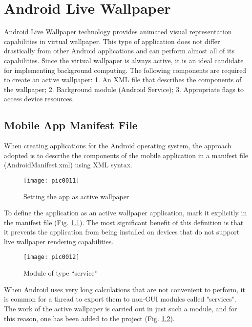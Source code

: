 \newpage
\chapter{Android Live Wallpaper}
\label{chapter04}

Android Live Wallpaper technology provides animated visual representation capabilities in virtual wallpaper. This type of application does not differ drastically from other Android applications and can perform almost all of its capabilities. Since the virtual wallpaper is always active, it is an ideal candidate for implementing background computing. The following components are required to create an active wallpaper: 1. An XML file that describes the components of the wallpaper; 2. Background module (Android Service); 3. Appropriate flags to access device resources.

\section{Mobile App Manifest File}

When creating applications for the Android operating system, the approach adopted is to describe the components of the mobile application in a manifest file (AndroidManifest.xml) using XML syntax.

\begin{figure}[h]
\centering
\texttt{[image: pic0011]}
\caption{Setting the app as active wallpaper}
\label{fig:pic0011}
\end{figure}
\FloatBarrier

To define the application as an active wallpaper application, mark it explicitly in the manifest file (Fig. \ref{fig:pic0011}). The most significant benefit of this definition is that it prevents the application from being installed on devices that do not support live wallpaper rendering capabilities.

\begin{figure}[h]
\centering
\texttt{[image: pic0012]}
\caption{Module of type ``service''}
\label{fig:pic0012}
\end{figure}
\FloatBarrier

When Android uses very long calculations that are not convenient to perform, it is common for a thread to export them to non-GUI modules called "services". The work of the active wallpaper is carried out in just such a module, and for this reason, one has been added to the project (Fig. \ref{fig:pic0012}).

